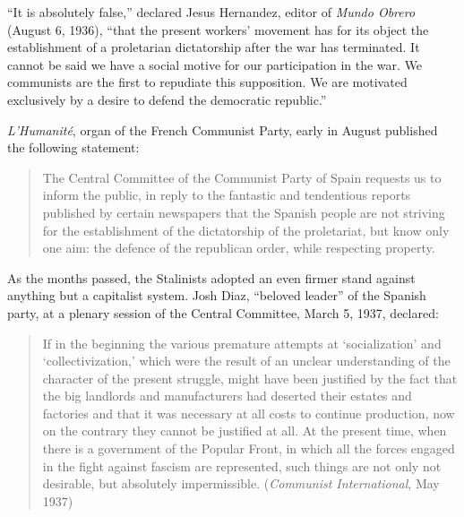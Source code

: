 ``It is absolutely false,'' declared Jesus Hernandez, editor of \emph{Mundo Obrero} (August 6, 1936), ``that the present workers’ movement has for its object the establishment of a proletarian dictatorship after the war has terminated. It cannot be said we have a social motive for our participation in the war. We communists are the first to repudiate this supposition. We are motivated exclusively by a desire to defend the democratic republic.''

\emph{L’Humanité}, organ of the French Communist Party, early in August published the following statement:
\begin{quote}
  The Central Committee of the Communist Party of Spain requests us to inform the public, in reply to the fantastic and tendentious reports published by certain newspapers that the Spanish people are not striving for the establishment of the dictatorship of the proletariat, but know only one aim: the defence of the republican order, while respecting property.
\end{quote}
As the months passed, the Stalinists adopted an even firmer stand against anything but a capitalist system. Josh Diaz, ``beloved leader'' of the Spanish party, at a plenary session of the Central Committee, March 5, 1937, declared:
\begin{quote}
  If in the beginning the various premature attempts at ‘socialization’ and ‘collectivization,’ which were the result of an unclear understanding of the character of the present struggle, might have been justified by the fact that the big landlords and manufacturers had deserted their estates and factories and that it was necessary at all costs to continue production, now on the contrary they cannot be justified at all. At the present time, when there is a government of the Popular Front, in which all the forces engaged in the fight against fascism are represented, such things are not only not desirable, but absolutely impermissible. (\emph{Communist International}, May 1937)
\end{quote}
